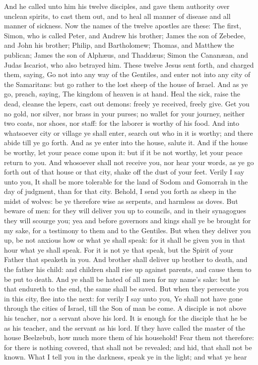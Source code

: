 And he called unto him his twelve disciples, and gave them authority over unclean spirits, to cast them out, and to heal all manner of disease and all manner of sickness.  Now the names of the twelve apostles are these: The first, Simon, who is called Peter, and Andrew his brother; James the son of Zebedee, and John his brother; Philip, and Bartholomew; Thomas, and Matthew the publican; James the son of Alphæus, and Thaddæus; Simon the Cananæan, and Judas Iscariot, who also betrayed him.  These twelve Jesus sent forth, and charged them, saying, Go not into any way of the Gentiles, and enter not into any city of the Samaritans: but go rather to the lost sheep of the house of Israel. And as ye go, preach, saying, The kingdom of heaven is at hand. Heal the sick, raise the dead, cleanse the lepers, cast out demons: freely ye received, freely give. Get you no gold, nor silver, nor brass in your purses; no wallet for your journey, neither two coats, nor shoes, nor staff: for the laborer is worthy of his food. And into whatsoever city or village ye shall enter, search out who in it is worthy; and there abide till ye go forth. And as ye enter into the house, salute it. And if the house be worthy, let your peace come upon it: but if it be not worthy, let your peace return to you. And whosoever shall not receive you, nor hear your words, as ye go forth out of that house or that city, shake off the dust of your feet. Verily I say unto you, It shall be more tolerable for the land of Sodom and Gomorrah in the day of judgment, than for that city.  Behold, I send you forth as sheep in the midst of wolves: be ye therefore wise as serpents, and harmless as doves. But beware of men: for they will deliver you up to councils, and in their synagogues they will scourge you; yea and before governors and kings shall ye be brought for my sake, for a testimony to them and to the Gentiles. But when they deliver you up, be not anxious how or what ye shall speak: for it shall be given you in that hour what ye shall speak. For it is not ye that speak, but the Spirit of your Father that speaketh in you. And brother shall deliver up brother to death, and the father his child: and children shall rise up against parents, and cause them to be put to death. And ye shall be hated of all men for my name’s sake: but he that endureth to the end, the same shall be saved. But when they persecute you in this city, flee into the next: for verily I say unto you, Ye shall not have gone through the cities of Israel, till the Son of man be come.  A disciple is not above his teacher, nor a servant above his lord. It is enough for the disciple that he be as his teacher, and the servant as his lord. If they have called the master of the house Beelzebub, how much more them of his household! Fear them not therefore: for there is nothing covered, that shall not be revealed; and hid, that shall not be known. What I tell you in the darkness, speak ye in the light; and what ye hear 
